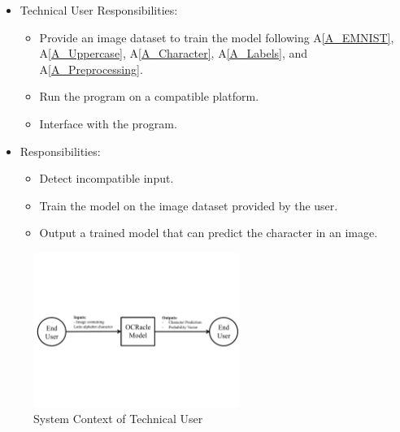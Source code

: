 \documentclass[12pt]{article}
\begin{document}
\begin{itemize}
  \item Technical User Responsibilities:
  \begin{itemize}
  \item Provide an image dataset to train the model following A\ref{A_EMNIST}, A\ref{A_Uppercase}, A\ref{A_Character}, A\ref{A_Labels}, and A\ref{A_Preprocessing}.
  \item Run the program on a compatible platform.
  \item Interface with the program.
  \end{itemize}
  \item \progname{} Responsibilities:
  \begin{itemize}
  \item Detect incompatible input.
  \item Train the model on the image dataset provided by the user.
  \item Output a trained model that can predict the character in an image.
  \end{itemize}
  \end{itemize}

\begin{figure}[h!]
  \begin{center}
    \includegraphics[page=1, width=0.6\textwidth]{SystemContextFigure}
    \caption{System Context of Technical User}
    \label{Fig_SystemContext1} 
  \end{center}
\end{figure}

\end{document}
